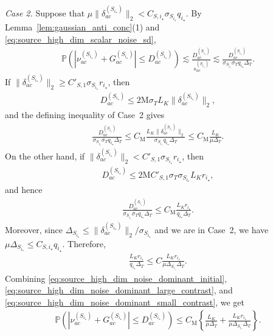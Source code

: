 \documentclass[10pt]{article}
\newcommand{\trg}{T}
\newcommand{\sigmaT}{\sigma_{\trg}}
\newcommand{\DeltaT}{\Delta_{\trg}}
\newcommand{\src}{S}
\newcommand{\sigmaSm}[1]{\sigma_{\src_{#1}}}
\newcommand{\DeltaSm}[1]{\Delta_{\src_{#1}}}
\begin{document}
\medskip
\noindent
\emph{Case 2.} Suppose that $\mu\|\delta_{ac}^{(\src_{i_\star})}\|_2<C_{\src,i_\star}\sigmaSm{i_\star}q_{i_\star}$. By Lemma~\ref{lem:gaussian_anti_conc}(1) and \eqref{eq:source_high_dim_scalar_noise_sd},
\begin{align}
\label{eq:source_high_dim_noise_dominant_initial}
    \mathbb P\left(|\nu_{ac}^{(\src_{i_\star})}+G_{ac}^{(\src_{i_\star})}|\le D_{ac}^{(\src_{i_\star})}\right)\lesssim \frac{D_{ac}^{(\src_{i_\star})}}{s_{ac}^{(\src_{i_\star})}}\lesssim \frac{D_{ac}^{(\src_{i_\star})}}{\sigmaSm{i_\star}\sigmaT q_{i_\star}\DeltaT}.
\end{align}
If $\|\delta_{ac}^{(\src_{i_\star})}\|_2\ge C'_{\src,1}\sigmaSm{i_\star}r_{i_\star}$, then
\begin{align}
    D_{ac}^{(\src_{i_\star})}\le 2\mathrm M\sigmaT L_K\|\delta_{ac}^{(\src_{i_\star})}\|_2,
\end{align}
and the defining inequality of Case~2 gives
\begin{align}
\label{eq:source_high_dim_noise_dominant_large_contrast}
    \frac{D_{ac}^{(\src_{i_\star})}}{\sigmaSm{i_\star}\sigmaT q_{i_\star}\DeltaT}\le C_{\mathrm M}\frac{L_K\|\delta_{ac}^{(\src_{i_\star})}\|_2}{\sigmaSm{i_\star}q_{i_\star}\DeltaT}\le C_{\mathrm M}\frac{L_K}{\mu\DeltaT}.
\end{align}
On the other hand, if $\|\delta_{ac}^{(\src_{i_\star})}\|_2<C'_{\src,1}\sigmaSm{i_\star}r_{i_\star}$, then
\begin{align}
    D_{ac}^{(\src_{i_\star})}\le 2\mathrm M C'_{\src,1}\sigmaT\sigmaSm{i_\star}L_Kr_{i_\star},
\end{align}
and hence
\begin{align}
\label{eq:source_high_dim_noise_dominant_small_contrast_initial}
    \frac{D_{ac}^{(\src_{i_\star})}}{\sigmaSm{i_\star}\sigmaT q_{i_\star}\DeltaT}\le C_{\mathrm M}\frac{L_Kr_{i_\star}}{q_{i_\star}\DeltaT}.
\end{align}
Moreover, since $\DeltaSm{i_\star}\le \|\delta_{ac}^{(\src_{i_\star})}\|_2/\sigmaSm{i_\star}$ and we are in Case~2, we have $\mu\DeltaSm{i_\star}\le C_{\src,i_\star}q_{i_\star}$. Therefore,
\begin{align}
\label{eq:source_high_dim_noise_dominant_small_contrast}
    \frac{L_Kr_{i_\star}}{q_{i_\star}\DeltaT}\le C\frac{L_Kr_{i_\star}}{\mu\DeltaSm{i_\star}\DeltaT}.
\end{align}
Combining \eqref{eq:source_high_dim_noise_dominant_initial}, \eqref{eq:source_high_dim_noise_dominant_large_contrast}, and \eqref{eq:source_high_dim_noise_dominant_small_contrast}, we get
\begin{align}
\label{eq:source_high_dim_noise_dominant_small_ball}
    \mathbb P\left(|\nu_{ac}^{(\src_{i_\star})}+G_{ac}^{(\src_{i_\star})}|\le D_{ac}^{(\src_{i_\star})}\right)\le C_{\mathrm M}\left\{\frac{L_K}{\mu\DeltaT}+\frac{L_Kr_{i_\star}}{\mu\DeltaSm{i_\star}\DeltaT}\right\}.
\end{align}
\end{document}
